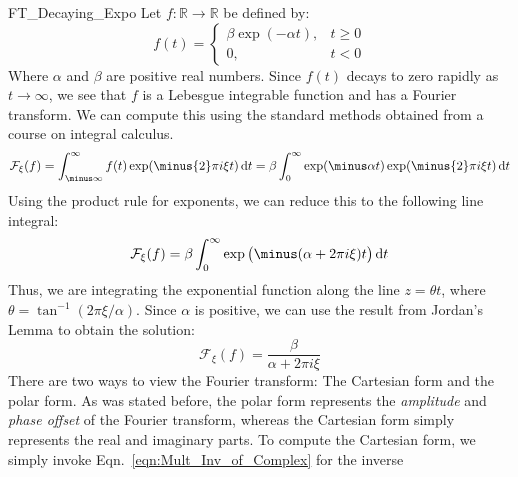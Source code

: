     \begin{lexample}{}{FT_Decaying_Expo}
        Let $f:\mathbb{R}\rightarrow\mathbb{R}$ be defined by:
        \begin{equation}
            f(t)=
            \begin{cases}
                \beta\exp(\minus\alpha{t}),&t\geq{0}\\
                0,&t<0
            \end{cases}
        \end{equation}
        Where $\alpha$ and $\beta$ are positive real numbers.
        Since $f(t)$ decays to zero rapidly as
        $t\rightarrow\infty$, we see that $f$ is a
        Lebesgue integrable function and has a Fourier
        transform. We can compute this using the standard
        methods obtained from a course on integral calculus.
        \begin{equation}
            \mathcal{F}_{\xi}(f)=\int_{\minus\infty}^{\infty}f(t)
                                    \exp(\minus{2}\pi{i}\xi{t})\diff{t}
                                =\beta\int_{0}^{\infty}
                                    \exp(\minus\alpha{t})
                                    \exp(\minus{2}\pi{i}\xi{t})\diff{t}
        \end{equation}
        Using the product rule for exponents, we can
        reduce this to the following line integral:
        \begin{equation}
            \mathcal{F}_{\xi}(f)=
            \beta\int_{0}^{\infty}\exp\big(
                \minus(\alpha+2\pi{i}\xi)t\big)\diff{t}
        \end{equation}
        Thus, we are integrating the exponential function
        along the line $z=\theta{t}$, where
        $\theta=\tan^{\minus{1}}(2\pi\xi/\alpha)$.
        Since $\alpha$ is positive, we can use the result
        from Jordan's Lemma to obtain the solution:
        \begin{equation}
            \mathcal{F}_{\xi}(f)
            =\frac{\beta}{\alpha+2\pi{i}\xi}
        \end{equation}
        There are two ways to view the Fourier
        transform: The Cartesian form and the
        polar form. As was stated before, the
        polar form represents the \textit{amplitude}
        and \textit{phase offset} of the Fourier
        transform, whereas the Cartesian form simply
        represents the real and imaginary parts. To
        compute the Cartesian form, we simply invoke
        Eqn.~\ref{eqn:Mult_Inv_of_Complex} for the inverse

\end{lexample}
